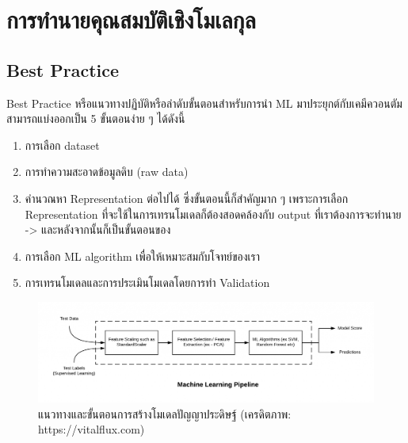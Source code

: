 

\chapter{การทำนายคุณสมบัติเชิงโมเลกุล}
\label{ch:predict_molprop}

\section{Best Practice}

Best Practice หรือแนวทางปฏิบัติหรือลำดับขั้นตอนสำหรับการนำ ML มาประยุกต์กับเคมีควอนตัมสามารถแบ่งออกเป็น 5 ขั้นตอนง่าย ๆ ได้ดังนี้

\begin{enumerate}
    \item การเลือก dataset
    \item การทำความสะอาดข้อมูลดิบ (raw data)
    \item คำนวณหา Representation ต่อไปได้ ซึ่งขั้นตอนนี้ก็สำคัญมาก ๆ เพราะการเลือก Representation 
    ที่จะใช้ในการเทรนโมเดลก็ต้องสอดคล้องกับ output ที่เราต้องการจะทำนาย -> และหลังจากนั้นก็เป็นขั้นตอนของ
    \item การเลือก ML algorithm เพื่อให้เหมาะสมกับโจทย์ของเรา 
    \item การเทรนโมเดลและการประเมินโมเดลโดยการทำ Validation
\end{enumerate}

\begin{figure}[H]
    \centering
    \includegraphics[width=0.9\linewidth]{fig/ml_pipeline.png}
    \caption{แนวทางและขั้นตอนการสร้างโมเดลปัญญาประดิษฐ์ (เครดิตภาพ: https://vitalflux.com)}
    \label{fig:ml_pipeline}
\end{figure}

